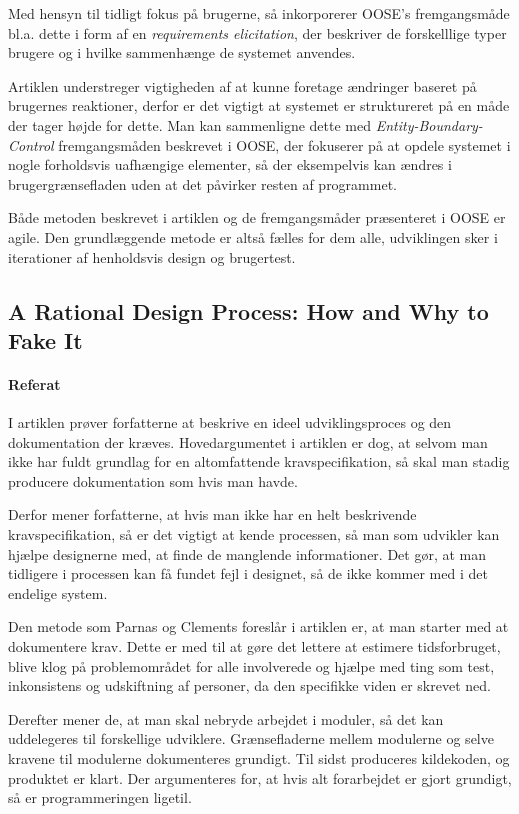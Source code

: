 \documentclass[12pt]{article}
\begin{document}
Med hensyn til tidligt fokus på brugerne, så inkorporerer OOSE's fremgangsmåde bl.a. dette i form af en \emph{requirements elicitation}, der beskriver de forskelllige typer brugere og i hvilke sammenhænge de systemet anvendes.

Artiklen understreger vigtigheden af at kunne foretage ændringer baseret på brugernes reaktioner, derfor er det vigtigt at systemet er struktureret på en måde der tager højde for dette. Man kan sammenligne dette med \emph{Entity-Boundary-Control} fremgangsmåden beskrevet i OOSE, der fokuserer på at opdele systemet i nogle forholdsvis uafhængige elementer, så der eksempelvis kan ændres i brugergrænsefladen uden at det påvirker resten af programmet.

Både metoden beskrevet i artiklen og de fremgangsmåder præsenteret i OOSE er agile. Den grundlæggende metode er altså fælles for dem alle, udviklingen sker i iterationer af henholdsvis design og brugertest.

\subsection{A Rational Design Process: How and Why to Fake It}
\label{sub:a_rational_design_process}
\paragraph{Referat}
I artiklen \cite{parnas1986rational} prøver forfatterne at beskrive en ideel udviklingsproces og den dokumentation der kræves. Hovedargumentet i artiklen er dog, at selvom man ikke har fuldt grundlag for en altomfattende kravspecifikation, så skal man stadig producere dokumentation som hvis man havde.

Derfor mener forfatterne, at hvis man ikke har en helt beskrivende kravspecifikation, så er det vigtigt at kende processen, så man som udvikler kan hjælpe designerne med, at finde de manglende informationer. Det gør, at man tidligere i processen kan få fundet fejl i designet, så de ikke kommer med i det endelige system.

Den metode som Parnas og Clements foreslår i artiklen er, at man starter med at dokumentere krav. Dette er med til at gøre det lettere at estimere tidsforbruget, blive klog på problemområdet for alle involverede og hjælpe med ting som test, inkonsistens og udskiftning af personer, da den specifikke viden er skrevet ned.

Derefter mener de, at man skal nebryde arbejdet i moduler, så det kan uddelegeres til forskellige udviklere. Grænsefladerne mellem modulerne og selve kravene til modulerne dokumenteres grundigt. Til sidst produceres kildekoden, og produktet er klart. Der argumenteres for, at hvis alt forarbejdet er gjort grundigt, så er programmeringen ligetil.
\end{document}
